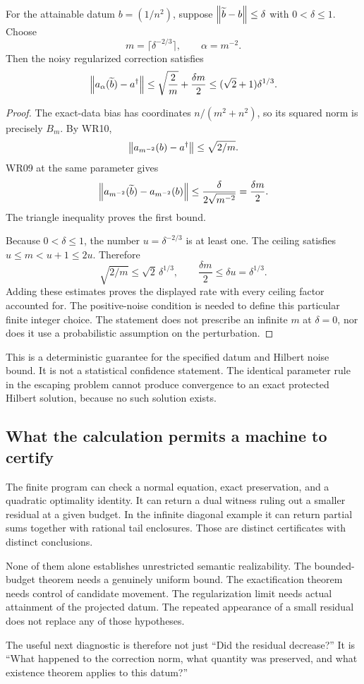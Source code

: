 \begin{corollary}\label{WR12}
For the attainable datum $b=(1/n^2)$, suppose $\left\lVert\widetilde b-b\right\rVert\le\delta$ with $0<\delta\le1$. Choose
\[
 m=\lceil\delta^{-2/3}\rceil,\qquad\alpha=m^{-2}.
\]
Then the noisy regularized correction satisfies
\[
 \left\lVert a_\alpha(\widetilde b)-a^\dagger\right\rVert
 \le\sqrt{\frac2m}+\frac{\delta m}{2}
 \le(\sqrt2+1)\delta^{1/3}.
\]
\end{corollary}
\begin{proof}
The exact-data bias has coordinates $n/(m^2+n^2)$, so its squared norm is precisely $B_m$. By WR10,
\[
 \left\lVert a_{m^{-2}}(b)-a^\dagger\right\rVert\le\sqrt{2/m}.
\]
WR09 at the same parameter gives
\[
 \left\lVert a_{m^{-2}}(\widetilde b)-a_{m^{-2}}(b)\right\rVert
 \le\frac{\delta}{2\sqrt{m^{-2}}}=\frac{\delta m}{2}.
\]
The triangle inequality proves the first bound.

Because $0<\delta\le1$, the number $u=\delta^{-2/3}$ is at least one. The ceiling satisfies $u\le m<u+1\le2u$. Therefore
\[
 \sqrt{2/m}\le\sqrt2\,\delta^{1/3},
 \qquad \frac{\delta m}{2}\le\delta u=\delta^{1/3}.
\]
Adding these estimates proves the displayed rate with every ceiling factor accounted for. The positive-noise condition is needed to define this particular finite integer choice. The statement does not prescribe an infinite $m$ at $\delta=0$, nor does it use a probabilistic assumption on the perturbation.
\end{proof}

This is a deterministic guarantee for the specified datum and Hilbert noise bound. It is not a statistical confidence statement. The identical parameter rule in the escaping problem cannot produce convergence to an exact protected Hilbert solution, because no such solution exists.

\subsection{What the calculation permits a machine to certify}
The finite program can check a normal equation, exact preservation, and a quadratic optimality identity. It can return a dual witness ruling out a smaller residual at a given budget. In the infinite diagonal example it can return partial sums together with rational tail enclosures. Those are distinct certificates with distinct conclusions.

None of them alone establishes unrestricted semantic realizability. The bounded-budget theorem needs a genuinely uniform bound. The exactification theorem needs control of candidate movement. The regularization limit needs actual attainment of the projected datum. The repeated appearance of a small residual does not replace any of those hypotheses.

The useful next diagnostic is therefore not just ``Did the residual decrease?'' It is ``What happened to the correction norm, what quantity was preserved, and what existence theorem applies to this datum?''
